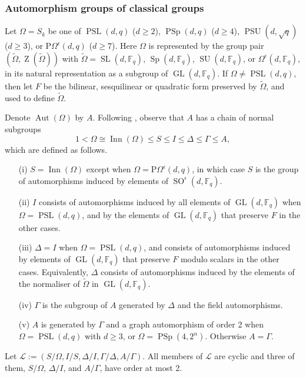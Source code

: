 \documentclass[12pt,twoside,reqno,psamsfonts]{amsproc}
\numberwithin{equation}{section}
\numberwithin{figure}{section}
\theoremstyle{plain}
\theoremstyle{definition}
\theoremstyle{remark}
\newcommand{\field}[1]{\mathbb{#1}}
\newcommand{\F}{\field{F}}
\newcommand{\Om}{\Omega}
\newcommand{\POm}{\mathrm{P}\Omega}
\DeclareMathOperator{\GL}{GL}
\DeclareMathOperator{\SL}{SL}
\DeclareMathOperator{\SO}{SO}
\DeclareMathOperator{\Sp}{Sp}
\DeclareMathOperator{\SU}{SU}
\DeclareMathOperator{\PSU}{PSU}
\DeclareMathOperator{\Aut}{Aut}
\DeclareMathOperator{\Inn}{Inn}
\DeclareMathOperator{\PSL}{PSL}
\DeclareMathOperator{\PSp}{PSp}
\DeclareMathOperator{\Zent}{Z}
\begin{document}
\subsubsection{Automorphism groups of classical groups}
Let $\Omega=S_k$ be one of $\PSL(d,q)$ ($d \ge 2$), $\PSp(d,q)$ ($d \ge 4$),
$\PSU(d, \sqrt{q})$ ($d \ge 3$), or $\POm^{\epsilon}(d,q)$ ($d \ge 7$).
Here $\Omega$ is represented by the group pair
$(\widetilde{\Omega},\Zent(\widetilde{\Omega}))$ with
$\widetilde{\Omega} = \SL(d,\F_q)$, $\Sp(d,\F_q)$, $\SU(d,\F_q)$, or
$\Om^{\epsilon}(d,\F_q)$, in its natural representation as a subgroup
of $\GL(d,\F_{q})$. 
If $\Omega \ne \PSL(d,q)$, then
let $F$ be the bilinear, sesquilinear or quadratic
form preserved by $\widetilde{\Omega}$, and used to define
$\widetilde{\Omega}$.

Denote $\Aut(\Omega)$ by $A$.
Following \cite[Chapter 2]{kleidmanliebeck90}, observe that  
$A$ has a chain of normal subgroups
$$1 < \Omega \cong \Inn(\Omega) \leqslant S \leqslant I \leqslant \Delta \leqslant \Gamma \leqslant A,$$ 
which are defined as follows.
\begin{enumerate}
\item[(i)] $S=\Inn(\Omega)$ except when $\Omega = \POm^{\epsilon}(d,q)$,
in which case $S$ is the group of automorphisms induced by elements of
$\SO^{\epsilon}(d,\F_q)$.
\item[(ii)] $I$ consists of automorphisms induced by all elements of
$\GL(d,\F_q)$ when $\Omega = \PSL(d,q)$, and by the elements 
of $\GL(d,\F_{q})$ that preserve $F$ in the other cases.
\item[(iii)] $\Delta = I$ when $\Omega = \PSL(d,q)$, and consists
of automorphisms induced by elements of $\GL(d,\F_{q})$ that
preserve $F$ modulo scalars in the other cases. Equivalently, $\Delta$
consists of automorphisms induced by the elements of the
normaliser of $\widetilde{\Omega}$ in $\GL(d,\F_{q})$.
\item[(iv)] $\Gamma$ is the subgroup of $A$ generated by $\Delta$ and  the
field automorphisms.
\item[(v)] $A$ is generated by $\Gamma$ and a graph automorphism  of
order 2 when $\Omega = \PSL(d,q)$ with $d \ge 3$, or $\Omega=\PSp(4,2^n)$.
Otherwise $A=\Gamma$.
\end{enumerate}
Let $\mathcal{L} := (S/\Omega, I/S, \Delta/I, \Gamma/\Delta, A/\Gamma)$.
All members of $\mathcal{L}$ are cyclic
and three of them, $S/\Omega$, $\Delta/I$, and
$A/\Gamma$, have order at most 2.
\end{document}
